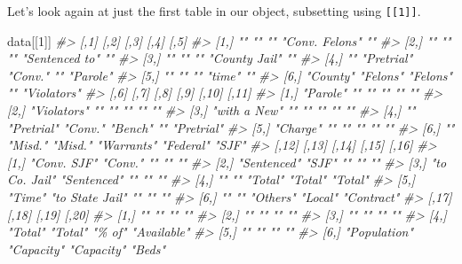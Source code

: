 \documentclass[
]{krantz}
\makeatletter
\newenvironment{Shaded}{\begin{snugshade}}{\end{snugshade}}
\newcommand{\CommentTok}[1]{\textcolor[rgb]{0.37,0.37,0.37}{\textit{#1}}}
\newcommand{\DecValTok}[1]{\textcolor[rgb]{0.06,0.06,0.06}{#1}}
\newcommand{\NormalTok}[1]{#1}
\newenvironment{kframe}{%
\medskip{}
\setlength{\fboxsep}{.8em}
 \def\at@end@of@kframe{}%
 \ifinner\ifhmode%
  \def\at@end@of@kframe{\end{minipage}}%
  \begin{minipage}{\columnwidth}%
 \fi\fi%
 \def\FrameCommand##1{\hskip\@totalleftmargin \hskip-\fboxsep
 \colorbox{shadecolor}{##1}\hskip-\fboxsep
     \hskip-\linewidth \hskip-\@totalleftmargin \hskip\columnwidth}%
 \MakeFramed {\advance\hsize-\width
   \@totalleftmargin\z@ \linewidth\hsize
   \@setminipage}}%
 {\par\unskip\endMakeFramed%
 \at@end@of@kframe}
\renewenvironment{Shaded}{\begin{kframe}}{\end{kframe}}
\makeatother
\begin{document}
Let's look again at just the first table in our object, subsetting using \texttt{{[}{[}1{]}{]}}.

\begin{Shaded}
\begin{Highlighting}[]
\NormalTok{data[[}\DecValTok{1}\NormalTok{]]}
\CommentTok{\#\textgreater{}      [,1]     [,2]       [,3]     [,4]           [,5]       }
\CommentTok{\#\textgreater{} [1,] ""       ""         ""       "Conv. Felons" ""         }
\CommentTok{\#\textgreater{} [2,] ""       ""         ""       "Sentenced to" ""         }
\CommentTok{\#\textgreater{} [3,] ""       ""         ""       "County Jail"  ""         }
\CommentTok{\#\textgreater{} [4,] ""       "Pretrial" "Conv."  ""             "Parole"   }
\CommentTok{\#\textgreater{} [5,] ""       ""         ""       "time"         ""         }
\CommentTok{\#\textgreater{} [6,] "County" "Felons"   "Felons" ""             "Violators"}
\CommentTok{\#\textgreater{}      [,6]         [,7]       [,8]    [,9]       [,10]     [,11]     }
\CommentTok{\#\textgreater{} [1,] "Parole"     ""         ""      ""         ""        ""        }
\CommentTok{\#\textgreater{} [2,] "Violators"  ""         ""      ""         ""        ""        }
\CommentTok{\#\textgreater{} [3,] "with a New" ""         ""      ""         ""        ""        }
\CommentTok{\#\textgreater{} [4,] ""           "Pretrial" "Conv." "Bench"    ""        "Pretrial"}
\CommentTok{\#\textgreater{} [5,] "Charge"     ""         ""      ""         ""        ""        }
\CommentTok{\#\textgreater{} [6,] ""           "Misd."    "Misd." "Warrants" "Federal" "SJF"     }
\CommentTok{\#\textgreater{}      [,12]         [,13]           [,14]    [,15]   [,16]     }
\CommentTok{\#\textgreater{} [1,] "Conv. SJF"   "Conv."         ""       ""      ""        }
\CommentTok{\#\textgreater{} [2,] "Sentenced"   "SJF"           ""       ""      ""        }
\CommentTok{\#\textgreater{} [3,] "to Co. Jail" "Sentenced"     ""       ""      ""        }
\CommentTok{\#\textgreater{} [4,] ""            ""              "Total"  "Total" "Total"   }
\CommentTok{\#\textgreater{} [5,] "Time"        "to State Jail" ""       ""      ""        }
\CommentTok{\#\textgreater{} [6,] ""            ""              "Others" "Local" "Contract"}
\CommentTok{\#\textgreater{}      [,17]        [,18]      [,19]      [,20]      }
\CommentTok{\#\textgreater{} [1,] ""           ""         ""         ""         }
\CommentTok{\#\textgreater{} [2,] ""           ""         ""         ""         }
\CommentTok{\#\textgreater{} [3,] ""           ""         ""         ""         }
\CommentTok{\#\textgreater{} [4,] "Total"      "Total"    "\% of"     "Available"}
\CommentTok{\#\textgreater{} [5,] ""           ""         ""         ""         }
\CommentTok{\#\textgreater{} [6,] "Population" "Capacity" "Capacity" "Beds"}
\end{Highlighting}
\end{Shaded}
\end{document}
